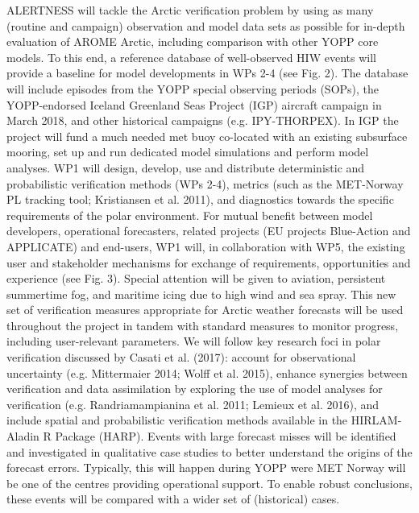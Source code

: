 \documentclass[a4paper,10pt]{article}
\begin{document}
ALERTNESS will tackle the Arctic verification problem by using as many (routine and campaign) observation and model data sets as possible for in-depth evaluation of AROME Arctic, including comparison with other YOPP core models. To this end, a reference database of well-observed HIW events will provide a baseline for model developments in WPs 2-4 (see Fig. 2). The database will include episodes from the YOPP special observing periods (SOPs), the YOPP-endorsed Iceland Greenland Seas Project (IGP) aircraft campaign in
March 2018, and other historical campaigns (e.g. IPY-THORPEX). In IGP the project will fund a much needed met buoy co-located with an existing subsurface mooring, set up and run dedicated model simulations and perform model analyses. WP1 will design, develop, use and distribute deterministic and probabilistic verification methods (WPs 2-4), metrics (such as the MET-Norway PL tracking tool; Kristiansen et al. 2011), and diagnostics towards the specific requirements of the polar environment. For mutual benefit between model developers, operational forecasters, related projects (EU projects Blue-Action and APPLICATE) and end-users, WP1 will, in collaboration with WP5, the existing user and stakeholder mechanisms for exchange of requirements, opportunities and experience (see Fig. 3). Special attention will be given to aviation, persistent summertime fog, and maritime icing due to high wind and sea spray. This new set of verification measures appropriate for Arctic weather forecasts will be used throughout the project in tandem with standard measures to monitor progress, including user-relevant parameters. We will follow key research foci in polar verification discussed by Casati et al. (2017): account for observational uncertainty (e.g. Mittermaier 2014; Wolff et al. 2015), enhance synergies between verification
and data assimilation by exploring the use of model analyses for verification (e.g. Randriamampianina et al. 2011; Lemieux et al. 2016), and include spatial and probabilistic verification methods available in the HIRLAM-Aladin R Package (HARP). Events with large forecast misses will be identified and investigated in qualitative case studies to better understand the origins of the forecast errors. Typically, this will happen during YOPP were MET Norway will be one of the centres providing operational support. To enable robust conclusions, these events will be compared with a wider set of (historical) cases.
\end{document}
